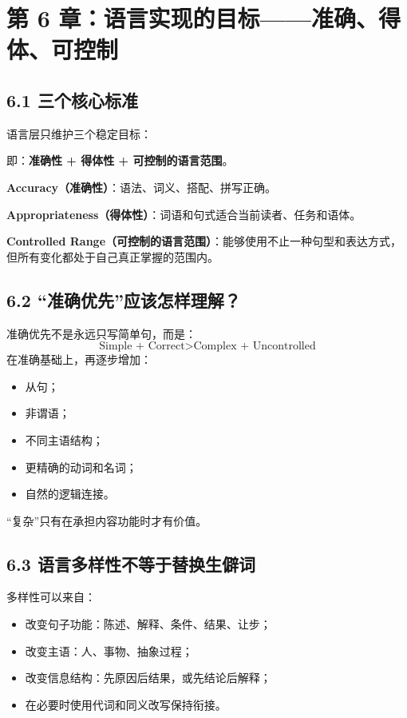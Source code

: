 \documentclass[11pt,a4paper]{ctexart}
\newcommand{\kw}[1]{\textbf{#1}}
\newcommand{\term}[2]{\textbf{#1（#2）}}
\begin{document}
\section{第 6 章：语言实现的目标——准确、得体、可控制}

\subsection{6.1 三个核心标准}
语言层只维护三个稳定目标：
\begin{center}
\end{center}
即：\kw{准确性 + 得体性 + 可控制的语言范围}。

\term{Accuracy}{准确性}：语法、词义、搭配、拼写正确。

\term{Appropriateness}{得体性}：词语和句式适合当前读者、任务和语体。

\term{Controlled Range}{可控制的语言范围}：能够使用不止一种句型和表达方式，但所有变化都处于自己真正掌握的范围内。

\subsection{6.2 “准确优先”应该怎样理解？}
准确优先不是永远只写简单句，而是：
\[
\boxed{
\text{Simple + Correct}
>
\text{Complex + Uncontrolled}
}
\]
在准确基础上，再逐步增加：
\begin{itemize}
  \item 从句；
  \item 非谓语；
  \item 不同主语结构；
  \item 更精确的动词和名词；
  \item 自然的逻辑连接。
\end{itemize}

“复杂”只有在承担内容功能时才有价值。

\subsection{6.3 语言多样性不等于替换生僻词}
多样性可以来自：
\begin{itemize}
  \item 改变句子功能：陈述、解释、条件、结果、让步；
  \item 改变主语：人、事物、抽象过程；
  \item 改变信息结构：先原因后结果，或先结论后解释；
  \item 在必要时使用代词和同义改写保持衔接。
\end{itemize}
\end{document}
